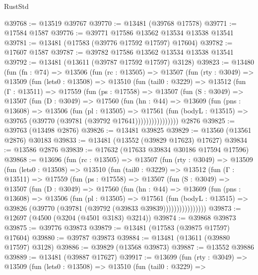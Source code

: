 \begin{lexlean}{RustStd}
\begin{coremodule}
@39768 := @13519 @39767
@39770 := @13481 (@39768 @17578)
@39771 := @17584 @1587
@39776 := @39771 @17586 @13562 @13534 @13538 @13541
@39781 := @13481 (@17583 (@39776 @17592 @17597) @17604)
@39782 := @17607 @1587
@39787 := @39782 @17586 @13562 @13534 @13538 @13541
@39792 := @13481 (@13611 (@39787 @17592 @17597) @3128)
@39823 := @13480
    (fun (fn : @74) =>
    @13506
      (fun (rc : @13505) =>
      @13507
        (fun (rty : @3049) =>
        @13509
          (fun (lets0 : @13508) =>
          @13510
            (fun (tail0 : @3229) =>
            @13512
              (fun (Γ : @13511) =>
              @17559
                (fun (ps : @17558) =>
                @13507
                  (fun (S : @3049) =>
                  @13507
                    (fun (D : @3049) =>
                    @17560
                      (fun (hn : @44) =>
                      @13609
                        (fun (pns : @13608) =>
                        @13506
                          (fun (pl : @13505) =>
                          @17561
                            (fun (bodyL : @13515) =>
                            @39765 (@39770 (@39781 (@39792 @17641))))))))))))))))
    @2876
@39825 := @39763 (@13498 @2876)
@39826 := @13481 @39825
@39829 := @13560 (@13561 @2876) @30183
@39833 := @13481 (@13552 (@39829 @17623) @17627)
@39834 := @13586 @2876
@39839 := @17632 (@17633 @39834 @30186 @17594 @17596)
@39868 := @13696
    (fun (rc : @13505) =>
    @13507
      (fun (rty : @3049) =>
      @13509
        (fun (lets0 : @13508) =>
        @13510
          (fun (tail0 : @3229) =>
          @13512
            (fun (Γ : @13511) =>
            @17559
              (fun (ps : @17558) =>
              @13507
                (fun (S : @3049) =>
                @13507
                  (fun (D : @3049) =>
                  @17560
                    (fun (hn : @44) =>
                    @13609
                      (fun (pns : @13608) =>
                      @13506
                        (fun (pl : @13505) =>
                        @17561
                          (fun (bodyL : @13515) =>
                          @39826 (@39770 (@39781 (@39792 (@39833 @39839))))))))))))))))
@39873 := @12697 (@4500 (@3204 (@4501 @3183) @3214))
@39874 := @39868 @39873
@39875 := @39776 @39873
@39879 := @13481 (@17583 (@39875 @17597) @17604)
@39880 := @39787 @39873
@39884 := @13481 (@13611 (@39880 @17597) @3128)
@39886 := @39829 (@13568 @39873)
@39887 := @13552 @39886
@39889 := @13481 (@39887 @17627)
@39917 := @13699
    (fun (rty : @3049) =>
    @13509
      (fun (lets0 : @13508) =>
      @13510
        (fun (tail0 : @3229) =>

\end{coremodule}
\end{lexlean}
